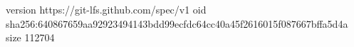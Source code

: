 version https://git-lfs.github.com/spec/v1
oid sha256:640867659aa92923494143bdd99ecfdc64cc40a45f2616015f087667bffa5d4a
size 112704
